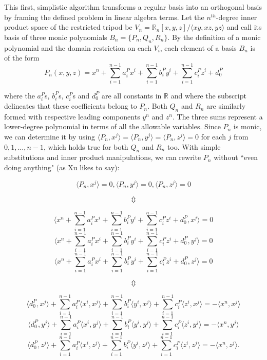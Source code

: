 \documentclass[letterpaper, 12pt]{article}
\begin{document}
This first, simplistic algorithm transforms a regular basis into an orthogonal basis by framing the defined problem in linear algebra terms. Let the $n^{th}$-degree inner product space of the restricted tripod be $V_n = \mathbb{R}_n [x, y, z] / \langle xy, xz, yz\rangle$ and call its basis of three monic polynomials $B_n = \{P_n, Q_n, R_n\}$. By the definition of a monic polynomial and the domain restriction on each $V_i$, each element of a basis $B_n$ is of the form
$$P_n(x,y,z) = x^n + \sum_{i=1}^{n-1}a_i^Px^i + \sum_{i=1}^{n-1}b_i^Py^i + \sum_{i=1}^{n-1}c_i^Pz^i + d_0^P$$

\noindent where the $a_i^P$s, $b_i^P$s, $c_i^P$s and $d_0^P$ are all constants in $\mathbb{R}$ and where the subscript delineates that these coefficients belong to $P_n$. Both $Q_n$ and $R_n$ are similarly formed with respective leading components $y^n$ and $z^n$. The three sums represent a lower-degree polynomial in terms of all the allowable variables. Since $P_n$ is monic, we can determine it by using $\langle P_n, x^j\rangle = \langle P_n,y^j\rangle = \langle P_n, z^j\rangle = 0$ for each $j$ from $0, 1, \ldots, n-1$, which holds true for both $Q_n$ and $R_n$ too. With simple substitutions and inner product manipulations, we can rewrite $P_n$ without ``even doing anything" (as Xu likes to say):

\singlespacing
\vspace{-2mm}
$$\langle P_n, x^j\rangle = 0, \langle P_n, y^j\rangle = 0, \langle P_n, z^j\rangle = 0$$

\vspace{-4mm}
$$\Updownarrow$$

\vspace{-4mm}
$$\langle x^n + \sum_{i=1}^{n-1} a_i^Px^i + \sum_{i=1}^{n-1} b_i^Py^i + \sum_{i=1}^{n-1} c_i^Pz^i + d_0^P, x^j\rangle = 0$$
$$\langle x^n + \sum_{i=1}^{n-1} a_i^Px^i + \sum_{i=1}^{n-1} b_i^Py^i + \sum_{i=1}^{n-1} c_i^Pz^i + d_0^P, y^j\rangle = 0$$
$$\langle x^n + \sum_{i=1}^{n-1} a_i^Px^i + \sum_{i=1}^{n-1} b_i^Py^i + \sum_{i=1}^{n-1} c_i^Pz^i + d_0^P, z^j\rangle = 0$$

\vspace{-2mm}
$$\Updownarrow$$

\vspace{-4mm}
$$\langle d_0^P, x^j\rangle + \sum_{i=1}^{n-1} a_i^P\langle x^i, x^j\rangle + \sum_{i=1}^{n-1} b_i^P\langle y^i, x^j\rangle + \sum_{i=1}^{n-1} c_i^P\langle z^i, x^j\rangle = -\langle x^n, x^j\rangle$$
$$\langle d_0^P, y^j\rangle + \sum_{i=1}^{n-1} a_i^P\langle x^i, y^j\rangle + \sum_{i=1}^{n-1} b_i^P\langle y^i, y^j\rangle + \sum_{i=1}^{n-1} c_i^P\langle z^i, y^j\rangle = -\langle x^n, y^j\rangle$$
$$\langle d_0^P, z^j\rangle + \sum_{i=1}^{n-1} a_i^P\langle x^i, z^j\rangle + \sum_{i=1}^{n-1} b_i^P\langle y^i, z^j\rangle + \sum_{i=1}^{n-1} c_i^P\langle z^i, z^j\rangle = -\langle x^n, z^j\rangle.$$
\end{document}
